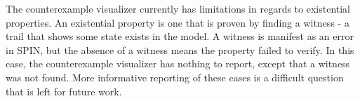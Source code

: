 The counterexample visualizer currently has limitations in regards to existential properties. An existential property is one that is proven by finding a witness - a trail that shows some state exists in the model. A witness is manifest as an error in SPIN, but the absence of a witness means the property failed to verify. In this case, the counterexample visualizer has nothing to report, except that a witness was not found. More informative reporting of these cases is a difficult question that is left for future work.
